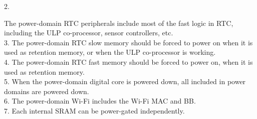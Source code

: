     \hypertarget{power-domains-note2}{2.} The power-domain RTC peripherals include most of the fast logic in RTC, including the ULP co-processor, sensor controllers, etc.\\
    \hypertarget{power-domains-note3}{3.} The power-domain RTC slow memory should be forced to power on when it is used as retention memory, or when the ULP co-processor is working.\\
    \hypertarget{power-domains-note4}{4.} The power-domain RTC fast memory should be forced to power on, when it is used as retention memory.\\
    \hypertarget{power-domains-note5}{5.} When the power-domain digital core is powered down, all included in power domains are powered down.\\
    \hypertarget{power-domains-note6}{6.} The power-domain Wi-Fi includes the Wi-Fi MAC and BB.\\
    \hypertarget{power-domains-note7}{7.} Each internal SRAM can be power-gated independently.\\
